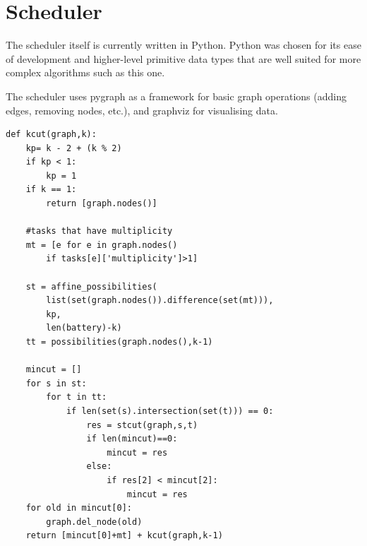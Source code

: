 \section{Scheduler}

The scheduler itself is currently written in Python. Python was chosen for its ease of development and higher-level primitive 
data types that are well suited for more complex algorithms such as this one.

The scheduler uses pygraph as a framework for basic graph operations (adding edges, removing nodes, etc.), and graphviz for 
visualising data. 

\lstset{numbers=left, mathescape=true, nolol=false,caption=Main K-Cut algorithm,label=lst:kcutimpl}
\begin{lstlisting}
def kcut(graph,k):
	kp= k - 2 + (k % 2)
	if kp < 1:
		kp = 1
	if k == 1:
		return [graph.nodes()]

	#tasks that have multiplicity
	mt = [e for e in graph.nodes() 
		if tasks[e]['multiplicity']>1]

	st = affine_possibilities(
	    list(set(graph.nodes()).difference(set(mt))),
	    kp,
	    len(battery)-k)
	tt = possibilities(graph.nodes(),k-1)

	mincut = []
	for s in st:
		for t in tt:
			if len(set(s).intersection(set(t))) == 0:
				res = stcut(graph,s,t)
				if len(mincut)==0:
					mincut = res
				else:
					if res[2] < mincut[2]:
						mincut = res
	for old in mincut[0]:
		graph.del_node(old)
	return [mincut[0]+mt] + kcut(graph,k-1)

\end{lstlisting}

